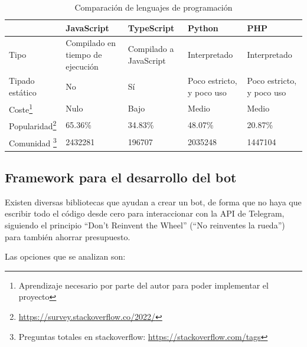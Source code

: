 \begin{table}
\begin{minipage}{\textwidth}
\begin{tabularx}{\textwidth}{|l|X|X|X|X|}
\hline
   & JavaScript                       & TypeScript             & Python                    & PHP                       \\
\hline
Tipo                                                & Compilado en tiempo de ejecución & Compilado a JavaScript & Interpretado              & Interpretado              \\
\hline
Tipado estático                                     & No                               & Sí                     & Poco estricto, y poco uso & Poco estricto, y poco uso \\
\hline
Coste\footnote{Aprendizaje necesario por parte del autor para poder implementar el proyecto}                                & Nulo                             & Bajo                   & Medio                     & Medio                     \\
\hline
Popularidad\footnote{\url{https://survey.stackoverflow.co/2022/}} & 65.36\%                          & 34.83\%                & 48.07\%                   & 20.87\%                   \\
\hline
Comunidad \footnote{Preguntas totales en stackoverflow: \url{https://stackoverflow.com/tags}}      & 2432281                          & 196707                 & 2035248                   & 1447104               \\
\hline
\end{tabularx}
\end{minipage}
\caption{Comparación de lenguajes de programación}\label{tab:comparacionLenguajes}
\end{table}


\subsection{Framework para el desarrollo del bot}

Existen diversas bibliotecas que ayudan a crear un bot, de forma que no haya que escribir todo el código desde cero para interaccionar con la API de Telegram, siguiendo el principio ``Don't Reinvent the Wheel'' (``No reinventes la rueda'') para también ahorrar presupuesto.

Las opciones que se analizan son:

